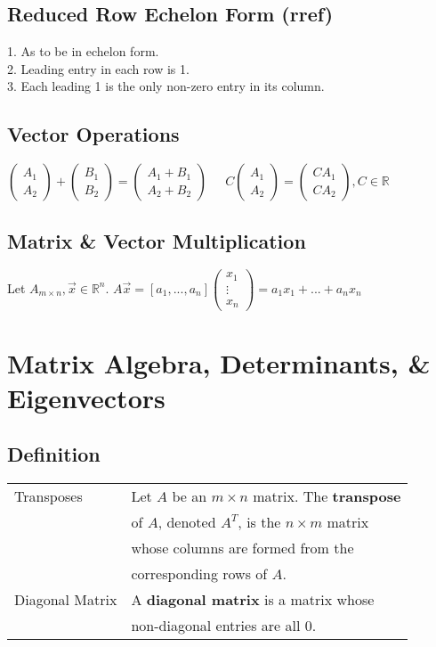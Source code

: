 \documentclass[5pt]{article}
\begin{document}
\begin{multicols}{2}
\subsection{Reduced Row Echelon Form (rref)}
1. As to be in echelon form. \\
2. Leading entry in each row is 1. \\
3. Each leading 1 is the only non-zero entry in its column. \\

\subsection{Vector Operations}
\small{
$\begin{pmatrix}A_1\\ A_2\end{pmatrix}+\begin{pmatrix}B_1\\ B_2\end{pmatrix}=\begin{pmatrix}A_1+B_1\\ A_2+B_2\end{pmatrix}\;\;\;\;$
$C\begin{pmatrix}A_1\\ A_2\end{pmatrix}=\begin{pmatrix}CA_1\\ CA_2\end{pmatrix}, C\in\mathbb{R}$}

\subsection{Matrix \& Vector Multiplication}
Let $A_{m\times n}, \vec{x}\in\mathbb{R}^n$. $A\vec{x}=\left[a_1, ...,a_n\right]\begin{pmatrix}x_1\\ \vdots\\ x_n\end{pmatrix}=a_1x_1 + ... + a_nx_n$


\section{Matrix Algebra, Determinants, \& Eigenvectors}
\subsection{Definition}
\begin{tabular}{ll}
  Transposes                & Let $A$ be an $m\times n$ matrix. The \textbf{transpose}\\
                            & of $A$, denoted $A^T$, is the $n\times m$ matrix\\
                            & whose columns are formed from the\\
                            & corresponding rows of $A$.\\
  Diagonal Matrix           & A \textbf{diagonal matrix} is a matrix whose\\
                            & non-diagonal entries are all 0.
\end{tabular}


\end{multicols}
\end{document}
